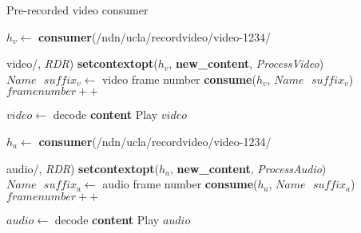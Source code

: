 \begin{algorithm}[hbtp]
\caption{Pre-recorded video consumer}
\label{alg:recordconsumer}
\begin{algorithmic}[4]
\State $h_v \leftarrow $ \textbf{consumer}(/ndn/ucla/recordvideo/video-1234/

video/, \textit{RDR})
\State \textbf{setcontextopt}($h_v$, \textbf{new\_content}, \textit{ProcessVideo})
\vspace{0.2cm}
	\State $Name \textbf{ } suffix_v \leftarrow $ video frame number
	\State \textbf{consume}($h_v$, $Name\textbf{ }suffix_v$)
	\State $framenumber ++$
	\EndWhile
\vspace{0.2cm}

   \State $video \leftarrow $ decode \textbf{content}
   \State Play $video$
\EndFunction

\vspace{0.4cm}

\State $h_a \leftarrow $ \textbf{consumer}(/ndn/ucla/recordvideo/video-1234/

audio/, \textit{RDR})
\State \textbf{setcontextopt}($h_a$, \textbf{new\_content}, \textit{ProcessAudio})
\vspace{0.2cm}
	\State $Name \textbf{ } suffix_a \leftarrow $ audio frame number
	\State \textbf{consume}($h_a$, $Name\textbf{ }suffix_a$)
	\State $framenumber ++$
	\EndWhile
\vspace{0.2cm}

   	\State $audio \leftarrow $ decode \textbf{content}
   	\State Play $audio$
\EndFunction
\end{algorithmic}
\end{algorithm}

